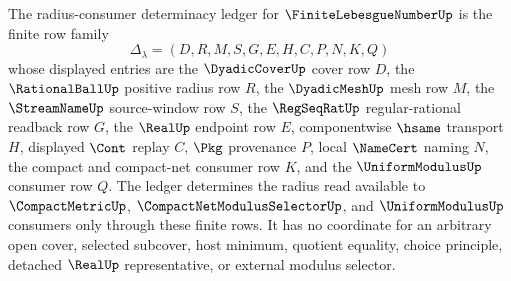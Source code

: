 \begin{definition}
\label{def:finite-lebesgue-number-radius-consumer-determinacy-ledger}
The radius-consumer determinacy ledger for $\FiniteLebesgueNumberUp$ is the finite row family
$$
\Delta_{\lambda}=(D,R,M,S,G,E,H,C,P,N,K,Q)
$$
whose displayed entries are the $\DyadicCoverUp$ cover row $D$, the $\RationalBallUp$ positive radius row $R$, the $\DyadicMeshUp$ mesh row $M$, the $\StreamNameUp$ source-window row $S$, the $\RegSeqRatUp$ regular-rational readback row $G$, the $\RealUp$ endpoint row $E$, componentwise $\hsame$ transport $H$, displayed $\Cont$ replay $C$, $\Pkg$ provenance $P$, local $\NameCert$ naming $N$, the compact and compact-net consumer row $K$, and the $\UniformModulusUp$ consumer row $Q$.
The ledger determines the radius read available to $\CompactMetricUp$, $\CompactNetModulusSelectorUp$, and $\UniformModulusUp$ consumers only through these finite rows. It has no coordinate for an arbitrary open cover, selected subcover, host minimum, quotient equality, choice principle, detached $\RealUp$ representative, or external modulus selector.
\end{definition}

